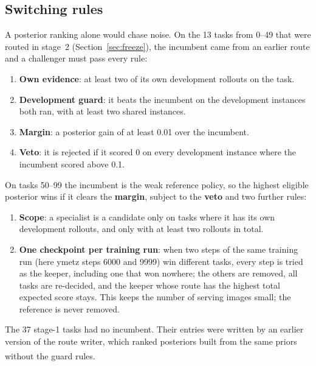 \documentclass[10pt]{article}
\newcommand{\pl}{\textsuperscript{\dag}}
\begin{document}
\subsection{Switching rules}
A posterior ranking alone would chase noise. On the 13 tasks from 0--49 that were routed in stage~2 (Section~\ref{sec:freeze}), the incumbent came from an earlier route and a challenger must pass every rule:
\begin{enumerate}
\item \textbf{Own evidence}: at least two of its own development rollouts on the task.
\item \textbf{Development guard}: it beats the incumbent on the development instances both ran, with at least two shared instances.
\item \textbf{Margin}: a posterior gain of at least 0.01 over the incumbent.
\item \textbf{Veto}: it is rejected if it scored 0 on every development instance where the incumbent scored above 0.1.
\end{enumerate}
On tasks 50--99 the incumbent is the weak reference policy, so the highest eligible posterior wins if it clears the \textbf{margin}, subject to the \textbf{veto} and two further rules:
\begin{enumerate}[resume]
\item \textbf{Scope}: a specialist is a candidate only on tasks where it has its own development rollouts, and only with at least two rollouts in total.
\item \textbf{One checkpoint per training run}: when two steps of the same training run (here ymetz steps 6000 and 9999) win different tasks, every step is tried as the keeper, including one that won nowhere; the others are removed, all tasks are re-decided, and the keeper whose route has the highest total expected score stays. This keeps the number of serving images small; the reference is never removed.
\end{enumerate}
The 37 stage-1 tasks had no incumbent. Their entries were written by an earlier version of the route writer, which ranked posteriors built from the same priors without the guard rules\pl.
\end{document}
